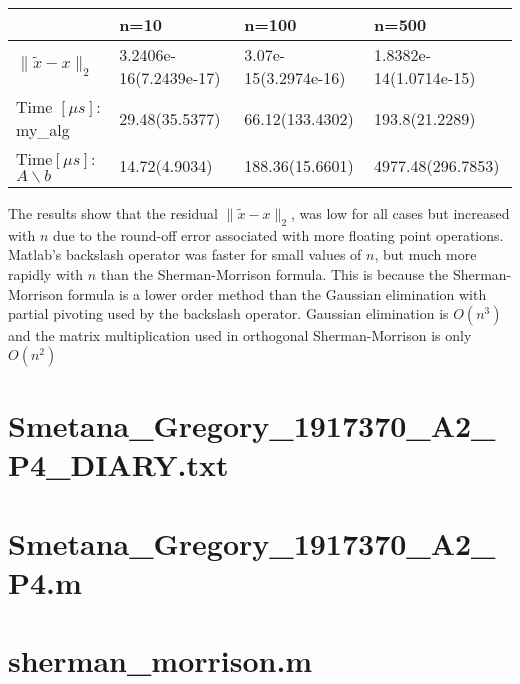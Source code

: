 \documentclass[11pt]{article} %
\begin{document}
\begin{table}[h!]
\centering
\begin{tabular}{| l | l | l|l |}\hline
 & n=10 & n=100 & n=500 \\ \hline
 $\| \tilde{x} -x \|_2$ &3.2406e-16(7.2439e-17) &   3.07e-15(3.2974e-16) &  1.8382e-14(1.0714e-15)  \\ \hline
 Time $[\mu s]$: my\_alg  \quad &  29.48(35.5377) &  66.12(133.4302)&  193.8(21.2289)\\ \hline
Time$[\mu s]$: $A \backslash b$&14.72(4.9034)&  188.36(15.6601) &  4977.48(296.7853)  \\ \hline
\end{tabular}
\caption{}
\label{tab:4d}
\end{table}
The results show that the residual  $\| \tilde{x} -x \|_2$, was low for all cases but increased with $n$ due to the round-off error associated with more floating point operations. Matlab's backslash operator was faster for small values of $n$, but much more rapidly with $n$ than the Sherman-Morrison formula. This is because the Sherman-Morrison formula is a lower order method than the Gaussian elimination with partial pivoting used by the backslash operator. Gaussian elimination is $O(n^3)$ and the matrix multiplication used in orthogonal Sherman-Morrison is only $O(n^2)$

\clearpage
\appendix
\section{Smetana\_Gregory\_1917370\_A2\_P4\_DIARY.txt}


\section{Smetana\_Gregory\_1917370\_A2\_P4.m}


\section{sherman\_morrison.m}

\end{document}
